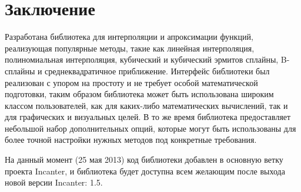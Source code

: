 \section{Заключение}

Разработана библиотека для интерполяции и апроксимации функций, реализующая популярные методы, такие как линейная интерполяция, полиномиальная интерполяция, кубический и кубический эрмитов сплайны, B-сплайны и среднеквадратичное приближение. Интерфейс библиотеки был реализован с упором на простоту и не требует особой математической подготовки, таким образом библиотека может быть использована широким классом пользователей, как для каких-либо математических вычислений, так и для графических и визуальных целей. В то же время библиотека предоставляет небольшой набор дополнительных опций, которые могут быть использованы для более точной настройки нужных методов под конкретные требования.

На данный момент (25 мая 2013) код библиотеки добавлен в основную ветку проекта Incanter, и библиотека будет доступна всем желающим после выхода новой версии Incanter: 1.5.

